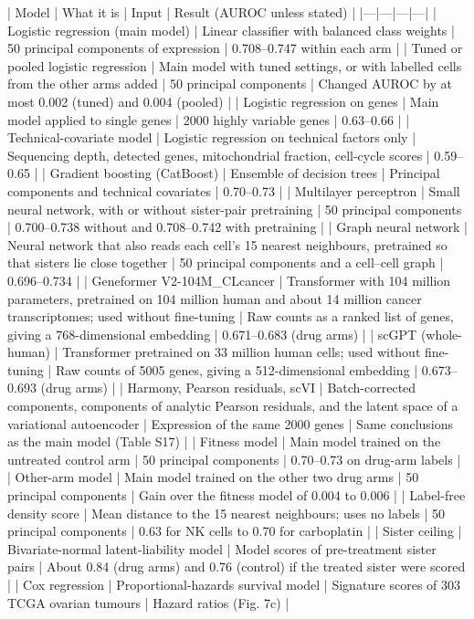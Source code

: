 \documentclass[11pt,a4paper]{article}
\begin{document}
| Model | What it is | Input | Result (AUROC unless stated) | |---|---|---|---| | Logistic regression (main model) | Linear classifier with balanced class weights | 50 principal components of expression | 0.708--0.747 within each arm | | Tuned or pooled logistic regression | Main model with tuned settings, or with labelled cells from the other arms added | 50 principal components | Changed AUROC by at most 0.002 (tuned) and 0.004 (pooled) | | Logistic regression on genes | Main model applied to single genes | 2000 highly variable genes | 0.63--0.66 | | Technical-covariate model | Logistic regression on technical factors only | Sequencing depth, detected genes, mitochondrial fraction, cell-cycle scores | 0.59--0.65 | | Gradient boosting (CatBoost) | Ensemble of decision trees | Principal components and technical covariates | 0.70--0.73 | | Multilayer perceptron | Small neural network, with or without sister-pair pretraining | 50 principal components | 0.700--0.738 without and 0.708--0.742 with pretraining | | Graph neural network | Neural network that also reads each cell's 15 nearest neighbours, pretrained so that sisters lie close together | 50 principal components and a cell--cell graph | 0.696--0.734 | | Geneformer V2-104M\_CLcancer | Transformer with 104 million parameters, pretrained on 104 million human and about 14 million cancer transcriptomes; used without fine-tuning | Raw counts as a ranked list of genes, giving a 768-dimensional embedding | 0.671--0.683 (drug arms) | | scGPT (whole-human) | Transformer pretrained on 33 million human cells; used without fine-tuning | Raw counts of 5005 genes, giving a 512-dimensional embedding | 0.673--0.693 (drug arms) | | Harmony, Pearson residuals, scVI | Batch-corrected components, components of analytic Pearson residuals, and the latent space of a variational autoencoder | Expression of the same 2000 genes | Same conclusions as the main model (Table S17) | | Fitness model | Main model trained on the untreated control arm | 50 principal components | 0.70--0.73 on drug-arm labels | | Other-arm model | Main model trained on the other two drug arms | 50 principal components | Gain over the fitness model of 0.004 to 0.006 | | Label-free density score | Mean distance to the 15 nearest neighbours; uses no labels | 50 principal components | 0.63 for NK cells to 0.70 for carboplatin | | Sister ceiling | Bivariate-normal latent-liability model | Model scores of pre-treatment sister pairs | About 0.84 (drug arms) and 0.76 (control) if the treated sister were scored | | Cox regression | Proportional-hazards survival model | Signature scores of 303 TCGA ovarian tumours | Hazard ratios (Fig. 7c) |
\end{document}
